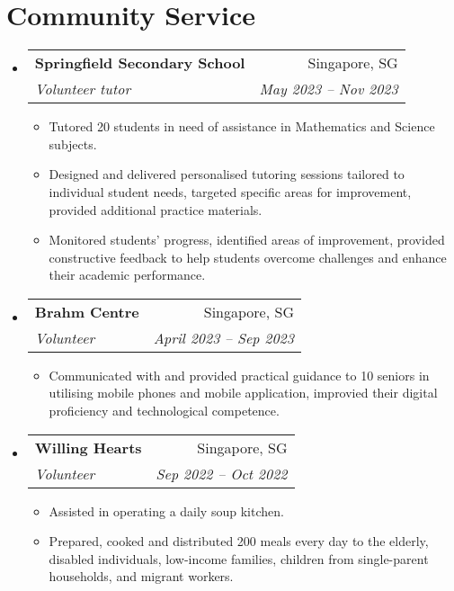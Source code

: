\documentclass[a4paper,11pt]{article}
\makeatletter
\newcommand{\resumeItemPaper}[1]{
    \item\small{
            {#1}
    }
}
\newcommand{\resumeSubheading}[4]{
    \vspace{-1pt}\item
    \begin{tabular*}{0.97\textwidth}{l@{\extracolsep{\fill}}r}
        \textbf{#1}       & #2                 \\
        \textit{\small#3} & \textit{\small #4} \\
    \end{tabular*}\vspace{-5pt}
}
\newcommand{\resumeSubHeadingListStart}{\begin{itemize}[leftmargin=*]}
\newcommand{\resumeSubHeadingListEnd}{\end{itemize}}
\newcommand{\resumeItemListStart}{\begin{itemize}}
\newcommand{\resumeItemListEnd}{\end{itemize}\vspace{-5pt}}
\makeatother
\begin{document}
\section{Community Service}
\resumeSubHeadingListStart
\resumeSubheading
{Springfield Secondary School}{Singapore, SG}
{Volunteer tutor}{May 2023 -- Nov 2023}
\resumeItemListStart
\resumeItemPaper{Tutored 20 students in need of assistance in Mathematics and Science subjects.}
\resumeItemPaper{Designed and delivered personalised tutoring sessions tailored to individual student needs, targeted specific areas for improvement, provided additional practice materials.}
\resumeItemPaper{Monitored students' progress, identified areas of improvement, provided constructive feedback to help students overcome challenges and enhance their academic performance.}
\resumeItemListEnd

\resumeSubheading
{Brahm Centre}{Singapore, SG}
{Volunteer}{April 2023 -- Sep 2023}
\resumeItemListStart
\resumeItemPaper{Communicated with and provided practical guidance to 10 seniors in utilising mobile phones and mobile application, improvied their digital proficiency and technological competence.}
\resumeItemListEnd

\resumeSubheading
{Willing Hearts}{Singapore, SG}
{Volunteer}{Sep 2022 -- Oct 2022}
\resumeItemListStart
\resumeItemPaper{Assisted in operating a daily soup kitchen.}
\resumeItemPaper{Prepared, cooked and distributed 200 meals every day to the elderly, disabled individuals, low-income families, children from single-parent households, and migrant workers.}
\resumeItemListEnd
\resumeSubHeadingListEnd
\end{document}
